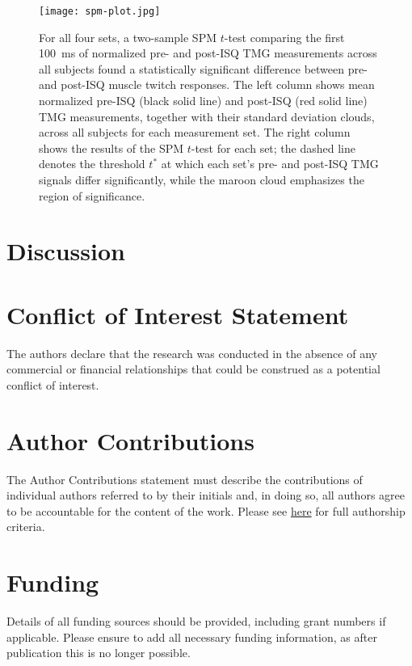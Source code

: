 \documentclass[utf8]{style/FrontiersinHarvard}
\begin{document}
\begin{figure}
	\centering
    \texttt{[image: spm-plot.jpg]}
    \caption{For all four sets, a two-sample SPM $ t $-test comparing the first \SI{100}{\milli \second} of normalized pre- and post-ISQ TMG measurements across all subjects found a statistically significant difference between pre- and post-ISQ muscle twitch responses.
    The left column shows mean normalized pre-ISQ (black solid line) and post-ISQ (red solid line) TMG measurements, together with their standard deviation clouds, across all subjects for each measurement set.
    The right column shows the results of the SPM $ t $-test for each set;
    the dashed line denotes the threshold $ t^{*} $ at which each set's pre- and post-ISQ TMG signals differ significantly, while the maroon cloud emphasizes the region of significance.}
    \label{fig:spm_example_across_subj_by_set}
\end{figure}

\section{Discussion}

\section*{Conflict of Interest Statement}
The authors declare that the research was conducted in the absence of any commercial or financial relationships that could be construed as a potential conflict of interest.

\section*{Author Contributions}
The Author Contributions statement must describe the contributions of individual authors referred to by their initials and, in doing so, all authors agree to be accountable for the content of the work.
Please see \href{https://www.frontiersin.org/about/policies-and-publication-ethics#AuthorshipAuthorResponsibilities}{here} for full authorship criteria.

\section*{Funding}
Details of all funding sources should be provided, including grant numbers if applicable.
Please ensure to add all necessary funding information, as after publication this is no longer possible.
\end{document}
